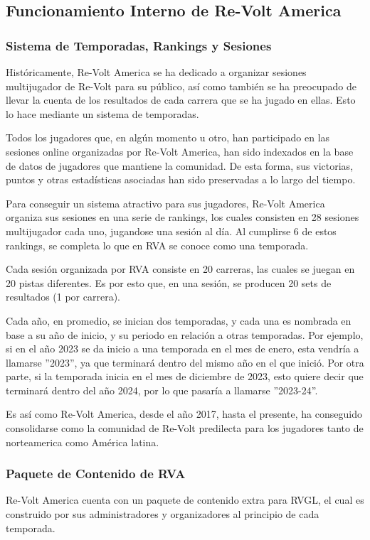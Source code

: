 \subsection{Funcionamiento Interno de Re-Volt America}

\subsubsection{Sistema de Temporadas, Rankings y Sesiones}
Históricamente, Re-Volt America se ha dedicado a organizar sesiones multijugador de Re-Volt para su público, así como también se ha preocupado de llevar la cuenta de los resultados de cada carrera que se ha jugado en ellas. Esto lo hace mediante un sistema de temporadas.

Todos los jugadores que, en algún momento u otro, han participado en las sesiones online organizadas por Re-Volt America, han sido indexados en la base de datos de jugadores que mantiene la comunidad. De esta forma, sus victorias, puntos y otras estadísticas asociadas han sido preservadas a lo largo del tiempo.

Para conseguir un sistema atractivo para sus jugadores, Re-Volt America organiza sus sesiones en una serie de rankings, los cuales consisten en 28 sesiones multijugador cada uno, jugandose una sesión al día. Al cumplirse 6 de estos rankings, se completa lo que en RVA se conoce como una temporada.

Cada sesión organizada por RVA consiste en 20 carreras, las cuales se juegan en 20 pistas diferentes. Es por esto que, en una sesión, se producen 20 sets de resultados (1 por carrera).

Cada año, en promedio, se inician dos temporadas, y cada una es nombrada en base a su año de inicio, y su periodo en relación a otras temporadas. Por ejemplo, si en el año 2023 se da inicio a una temporada en el mes de enero, esta vendría a llamarse ''2023'', ya que terminará dentro del mismo año en el que inició. Por otra parte, si la temporada inicia en el mes de diciembre de 2023, esto quiere decir que terminará dentro del año 2024, por lo que pasaría a llamarse ''2023-24''.

Es así como Re-Volt America, desde el año 2017, hasta el presente, ha conseguido consolidarse como la comunidad de Re-Volt predilecta para los jugadores tanto de norteamerica como América latina.

\subsubsection{Paquete de Contenido de RVA}
\label{problem:context:rva:pack}
Re-Volt America cuenta con un paquete de contenido extra para RVGL, el cual es construido por sus administradores y organizadores al principio de cada temporada.


